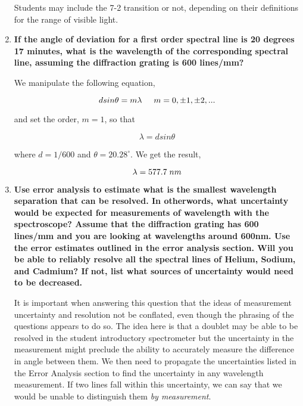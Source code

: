 \begin{enumerate}
\noindent Students may include the 7-2 transition or not, depending on their definitions for the range of visible light.

\item {\bf If the angle of deviation for a first order spectral line is 20 degrees 17 minutes, what is the wavelength of the corresponding spectral line, assuming the diffraction grating is 600 lines/mm?}\newline

We manipulate the following equation,

\begin{equation}
dsin\theta=m\lambda\hspace{5mm}m=0,\pm1,\pm2,...
\label{equ:spcg3}
\end{equation}

\noindent and set the order, $m=1$, so that

\begin{equation}
\lambda=dsin\theta
\label{equ:spcg4}
\end{equation}

\noindent where $d=1/600$ and $\theta=20.28^{\circ}$. We get the result,

\begin{equation}
\lambda=577.7\hspace{1mm}nm
\label{equ:spcg5}
\end{equation}

\item {\bf Use error analysis to estimate what is the smallest wavelength separation that can be resolved. In otherwords, what uncertainty would be expected for measurements of wavelength with the spectroscope? Assume that the diffraction grating has 600 lines/mm and you are looking at wavelengths around 600nm. Use the error estimates outlined in the error analysis section. Will you be able to reliably resolve all the spectral lines of Helium, Sodium, and Cadmium? If not, list what sources of uncertainty would need to be decreased.}\newline

It is important when answering this question that the ideas of measurement uncertainty and resolution not be conflated, even though the phrasing of the questions appears to do so. The idea here is that a doublet may be able to be resolved in the student introductory spectrometer but the uncertainty in the measurement might preclude the ability to accurately measure the difference in angle between them. We then need to propagate the uncertainties listed in the Error Analysis section to find the uncertainty in any wavelength measurement. If two lines fall within this uncertainty, we can say that we would be unable to distinguish them {\it by measurement}. 


\end{enumerate}
